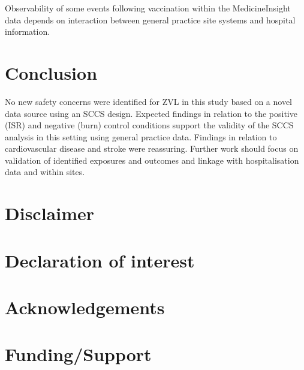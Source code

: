 \documentclass[review, endfloat]{elsarticle}
\begin{document}
Observability of some events following vaccination within the MedicineInsight data depends on interaction between general practice site systems and hospital information.

\section{Conclusion}

No new safety concerns were identified for ZVL in this study based on a novel data source using an SCCS design. Expected findings in relation to the positive (ISR) and negative (burn) control conditions support the validity of the SCCS analysis in this setting using general practice data. Findings in relation to cardiovascular disease and stroke were reassuring. Further work should focus on validation of identified exposures and outcomes and linkage with hospitalisation data and within sites.

\section{Disclaimer}

\section{Declaration of interest}

\section{Acknowledgements}

\section{Funding/Support}

\listoftodos[Notes]




\end{document}
